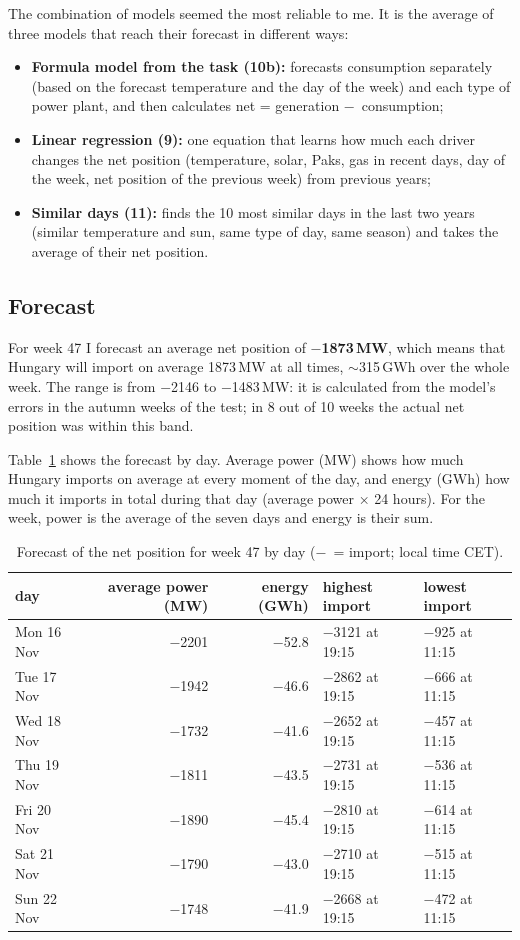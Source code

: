 \documentclass[10pt,a4paper]{article}
\newcommand{\m}{$-$}
\begin{document}
The combination of models seemed the most reliable to me. It is the average of three models that reach their
forecast in different ways:
\begin{itemize}\setlength\itemsep{1pt}
\item \textbf{Formula model from the task (10b):} forecasts consumption separately (based on the forecast
temperature and the day of the week) and each type of power plant, and then calculates net = generation \m\
consumption;
\item \textbf{Linear regression (9):} one equation that learns how much each driver changes the net position (temperature, solar, Paks, gas in recent days, day of the week, net position of the previous week) from previous years;
\item \textbf{Similar days (11):} finds the 10 most similar days in the last two years (similar temperature and
sun, same type of day, same season) and takes the average of their net position.
\end{itemize}


\subsection*{Forecast}

For week 47 I forecast an average net position of \textbf{\m1873\,MW}, which means that Hungary will import on
average 1873\,MW at all times, $\sim$315\,GWh over the whole week. The range is from \m2146 to \m1483\,MW: it is
calculated from the model's errors in the autumn weeks of the test; in 8 out of 10 weeks the actual net position
was within this band.

Table~\ref{tab:napoved} shows the forecast by day. Average power (MW) shows how much Hungary imports on average
at every moment of the day, and energy (GWh) how much it imports in total during that day (average power × 24
hours). For the week, power is the average of the seven days and energy is their sum.

\begin{table}[H]
\centering\footnotesize
\begin{tabular}{lrrll}
\toprule
day & average power (MW) & energy (GWh) & highest import & lowest import \\
\midrule
Mon 16 Nov & \m2201 & \m52.8 & \m3121 at 19:15 & \m925 at 11:15 \\
Tue 17 Nov & \m1942 & \m46.6 & \m2862 at 19:15 & \m666 at 11:15 \\
Wed 18 Nov & \m1732 & \m41.6 & \m2652 at 19:15 & \m457 at 11:15 \\
Thu 19 Nov & \m1811 & \m43.5 & \m2731 at 19:15 & \m536 at 11:15 \\
Fri 20 Nov & \m1890 & \m45.4 & \m2810 at 19:15 & \m614 at 11:15 \\
Sat 21 Nov & \m1790 & \m43.0 & \m2710 at 19:15 & \m515 at 11:15 \\
Sun 22 Nov & \m1748 & \m41.9 & \m2668 at 19:15 & \m472 at 11:15 \\
\bottomrule
\end{tabular}
\caption{Forecast of the net position for week 47 by day (\m\ = import; local time CET).}
\label{tab:napoved}
\end{table}
\end{document}
